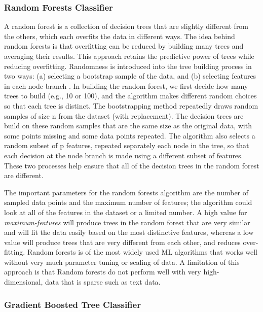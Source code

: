 \documentclass[sigconf]{acmart}
\begin{document}
\subsubsection{Random Forests Classifier}

A random forest is a collection of decision trees that are slightly different 
from the others, which each overfits the data in different ways. The idea 
behind random forests is that overfitting can be reduced by building many 
trees and averaging their results. This approach retains the predictive power 
of trees while reducing overfitting. Randomness is introduced into the tree 
building process in two ways: (a) selecting a bootstrap sample of the data, 
and (b) selecting features in each node branch \cite{muller17,raschka17}. In 
building the random forest, we first decide how many trees to build (e.g., 10 
or 100), and the algorithm makes different random choices so that each tree is 
distinct. The bootstrapping method repeatedly draws random samples of size n 
from the dataset (with replacement). The decision trees are build on these 
random samples that are the same size as the original data, with some points 
missing and some data points repeated. The algorithm also selects a random 
subset of p features, repeated separately each node in the tree, so that 
each decision at the node branch is made using a different subset of features.
These two processes help ensure that all of the decision trees in the random
forest are different. 

The important parameters for the random forests 
algorithm are the number of sampled data points and the maximum number of 
features; the algorithm could look at all of the features in the dataset
or a limited number. A high value for \emph{maximum-features} will produce 
trees in the random forest that are very similar and will fit the data 
easily based on the most distinctive features, whereas a low value will 
produce trees that are very different from each other, and reduces over-
fitting. Random forests is of the most widely used ML algorithms that works 
well without very much parameter tuning or scaling of data. A limitation of 
this approach is that Random forests do not perform well with very high-
dimensional, data that is sparse such as text data.

\subsubsection{Gradient Boosted Tree Classifier}
\end{document}
